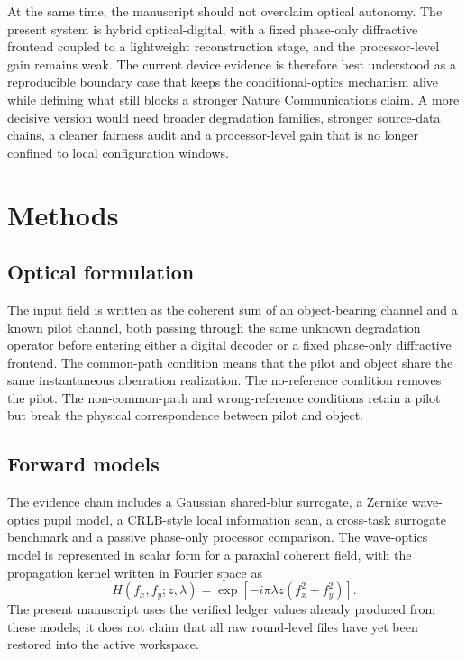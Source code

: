 \documentclass[11pt]{article}
\begin{document}
At the same time, the manuscript should not overclaim optical autonomy. The present system is hybrid optical-digital, with a fixed phase-only diffractive frontend coupled to a lightweight reconstruction stage, and the processor-level gain remains weak. The current device evidence is therefore best understood as a reproducible boundary case that keeps the conditional-optics mechanism alive while defining what still blocks a stronger Nature Communications claim. A more decisive version would need broader degradation families, stronger source-data chains, a cleaner fairness audit and a processor-level gain that is no longer confined to local configuration windows.

\section*{Methods}
\subsection*{Optical formulation}
The input field is written as the coherent sum of an object-bearing channel and a known pilot channel, both passing through the same unknown degradation operator before entering either a digital decoder or a fixed phase-only diffractive frontend. The common-path condition means that the pilot and object share the same instantaneous aberration realization. The no-reference condition removes the pilot. The non-common-path and wrong-reference conditions retain a pilot but break the physical correspondence between pilot and object.

\subsection*{Forward models}
The evidence chain includes a Gaussian shared-blur surrogate, a Zernike wave-optics pupil model, a CRLB-style local information scan, a cross-task surrogate benchmark and a passive phase-only processor comparison. The wave-optics model is represented in scalar form for a paraxial coherent field, with the propagation kernel written in Fourier space as
\begin{equation}
H(f_x,f_y;z,\lambda)=\exp\left[-i\pi\lambda z(f_x^2+f_y^2)\right].
\end{equation}
The present manuscript uses the verified ledger values already produced from these models; it does not claim that all raw round-level files have yet been restored into the active workspace.
\end{document}
